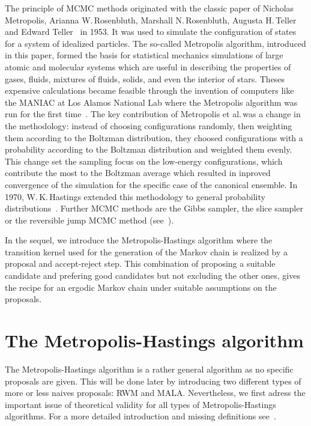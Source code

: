 The principle of MCMC methods originated with the classic paper of Nicholas Metropolis, Arianna W.\,Rosenbluth, Marshall N.\,Rosenbluth, Augusta H.\,Teller and Edward Teller~\autocite{Metropolis1953} in 1953. It was used to simulate the configuration of states for a system of idealized particles. The so-called Metropolis algorithm, introduced in this paper, formed the basis for statistical mechanics simulations of large atomic and molecular systems which are useful in describing the properties of gases, fluids, mixtures of fluids, solids, and even the interior of stars. Theses expensive calculations became feasible through the invention of computers like the MANIAC at Los Alamos National Lab where the Metropolis algorithm was run for the first time~\autocites{MCAtWork1987, UlamNeumannMC1987}. 
The key contribution of Metropolis et al.\,was a change in the methodology: instead of choosing configurations randomly, then weighting them according to the Boltzman distribution, they choosed configurations with a probability according to the Boltzman distribution and weighted them evenly. This change set the sampling focus on the low-energy configurations, which contribute the most to the Boltzman average which resulted in inproved convergence of the simulation for the specific case of the canonical ensemble. In 1970, W.\,K.\,Hastings extended this methodology to general probability distributions~\autocite{Hastings1970}. Further MCMC methods are the Gibbs sampler, the slice sampler or the reversible jump MCMC method (see~\autocite{Robert2005}).

In the sequel, we introduce the Metropolis-Hastings algorithm where the transition kernel used for the generation of the Markov chain is realized by a proposal and accept-reject step. This combination of proposing a suitable candidate and prefering good candidates but not excluding the other ones, gives the recipe for an ergodic Markov chain under suitable assumptions on the proposals.

\section{The Metropolis-Hastings algorithm}
\label{MH-TheMetropolis-HastingsAlgo}

The Metropolis-Hastings algorithm is a rather general algorithm as no specific proposals are given. This will be done later by introducing two different types of more or less naives proposals: RWM and MALA. Nevertheless, we first adress the important issue of theoretical validity for all types of Metropolis-Hastings algorithms. For a more detailed introduction and missing definitions see~\autocite{Robert2005}.

